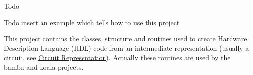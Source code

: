 \begin{DoxyRefDesc}{Todo}
\item[\hyperlink{todo__todo000001}{Todo}]insert an example which tells how to use this project\end{DoxyRefDesc}


This project contains the classes, structure and routines used to create Hardware Description Language (H\+DL) code from an intermediate representation (usually a circuit, see \hyperlink{src_circuit_page}{Circuit Representation}). Actually these routines are used by the bambu and koala projects. 